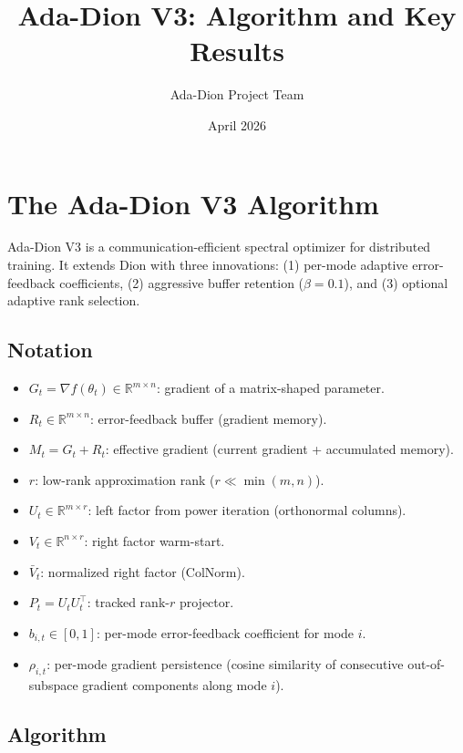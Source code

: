 \documentclass[11pt]{article}
\title{Ada-Dion V3: Algorithm and Key Results}
\author{Ada-Dion Project Team}
\date{April 2026}
\newcommand{\R}{\mathbb{R}}
\begin{document}
\maketitle

\section{The Ada-Dion V3 Algorithm}

Ada-Dion V3 is a communication-efficient spectral optimizer for distributed training. It extends Dion with three innovations: (1) per-mode adaptive error-feedback coefficients, (2) aggressive buffer retention ($\beta = 0.1$), and (3) optional adaptive rank selection.

\subsection{Notation}

\begin{itemize}
    \item $G_t = \nabla f(\theta_t) \in \R^{m \times n}$: gradient of a matrix-shaped parameter.
    \item $R_t \in \R^{m \times n}$: error-feedback buffer (gradient memory).
    \item $M_t = G_t + R_t$: effective gradient (current gradient + accumulated memory).
    \item $r$: low-rank approximation rank ($r \ll \min(m,n)$).
    \item $U_t \in \R^{m \times r}$: left factor from power iteration (orthonormal columns).
    \item $V_t \in \R^{n \times r}$: right factor warm-start.
    \item $\bar{V}_t$: normalized right factor (ColNorm).
    \item $P_t = U_t U_t^\top$: tracked rank-$r$ projector.
    \item $b_{i,t} \in [0,1]$: per-mode error-feedback coefficient for mode $i$.
    \item $\rho_{i,t}$: per-mode gradient persistence (cosine similarity of consecutive out-of-subspace gradient components along mode $i$).
\end{itemize}

\subsection{Algorithm}
\end{document}
